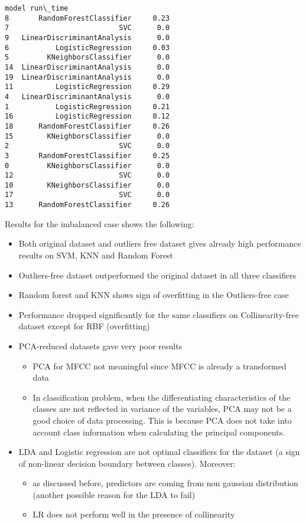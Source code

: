 \documentclass[11pt]{article}
\providecommand{\tightlist}{%
      \setlength{\itemsep}{0pt}\setlength{\parskip}{0pt}}
\begin{document}
\begin{tcolorbox}[breakable, size=fbox, boxrule=.5pt, pad at break*=1mm, opacityfill=0]
\begin{Verbatim}[commandchars=\\\{\}]
                         model run\_time
8       RandomForestClassifier     0.23
7                          SVC      0.0
9   LinearDiscriminantAnalysis      0.0
6           LogisticRegression     0.03
5         KNeighborsClassifier      0.0
14  LinearDiscriminantAnalysis      0.0
19  LinearDiscriminantAnalysis      0.0
11          LogisticRegression     0.29
4   LinearDiscriminantAnalysis      0.0
1           LogisticRegression     0.21
16          LogisticRegression     0.12
18      RandomForestClassifier     0.26
15        KNeighborsClassifier      0.0
2                          SVC      0.0
3       RandomForestClassifier     0.25
0         KNeighborsClassifier      0.0
12                         SVC      0.0
10        KNeighborsClassifier      0.0
17                         SVC      0.0
13      RandomForestClassifier     0.26
\end{Verbatim}
\end{tcolorbox}
        
    Results for the imbalanced case shows the following:

\begin{itemize}
\tightlist
\item
  Both original dataset and outliers free dataset gives already high
  performance results on SVM, KNN and Random Forest
\item
  Outliers-free dataset outperformed the original dataset in all three
  classifiers
\item
  Random forest and KNN shows sign of overfitting in the Outliers-free
  case
\item
  Performance dropped significantly for the same classifiers on
  Collinearity-free dataset except for RBF (overfitting)
\item
  PCA-reduced datasets gave very poor results

  \begin{itemize}
  \tightlist
  \item
    PCA for MFCC not meaningful since MFCC is already a transformed data
  \item
    In classification problem, when the differentiating characteristics
    of the classes are not reflected in variance of the variables, PCA
    may not be a good choice of data processing. This is because PCA
    does not take into account class information when calculating the
    principal components.
  \end{itemize}
\item
  LDA and Logistic regression are not optimal classifiers for the
  dataset (a sign of non-linear decision boundary between classes).
  Moreover:

  \begin{itemize}
  \tightlist
  \item
    as discussed before, predictors are coming from non gaussian
    distribution (another possible reason for the LDA to fail)
  \item
    LR does not perform well in the presence of collinearity
  \end{itemize}
\end{itemize}
\end{document}
